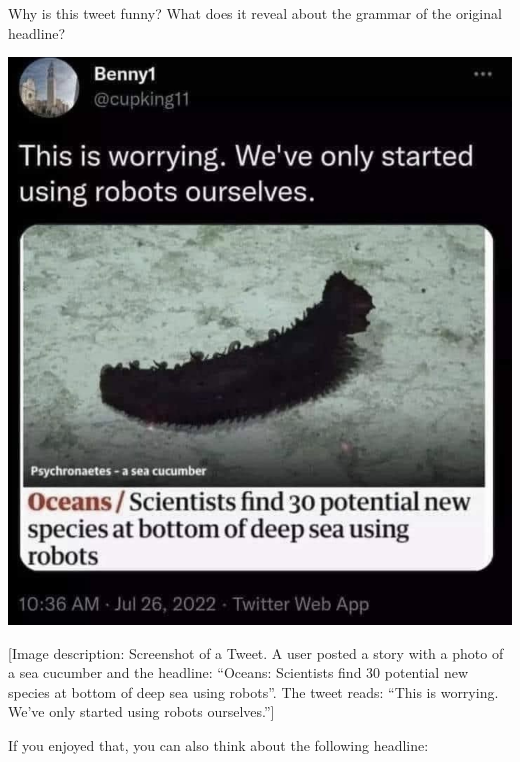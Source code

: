 \documentclass{article}
\begin{document}
Why is this tweet funny? What does it reveal about the grammar of the original headline?

\begin{center}
\includegraphics[width=0.5\linewidth, alt={Screenshot of a Tweet. A user posted a story with a photo of a sea cucumber and the headline: ``Oceans: Scientists find 30 potential new species at bottom of deep sea using robots''. The tweet reads: ``This is worrying. We've only started using robots ourselves.''}]{Images/deep-sea-robots.png}
\end{center}
[Image description: Screenshot of a Tweet. A user posted a story with a photo of a sea cucumber and the headline: ``Oceans: Scientists find 30 potential new species at bottom of deep sea using robots''. The tweet reads: ``This is worrying. We've only started using robots ourselves.'']


If you enjoyed that, you can also think about the following headline:
\end{document}
